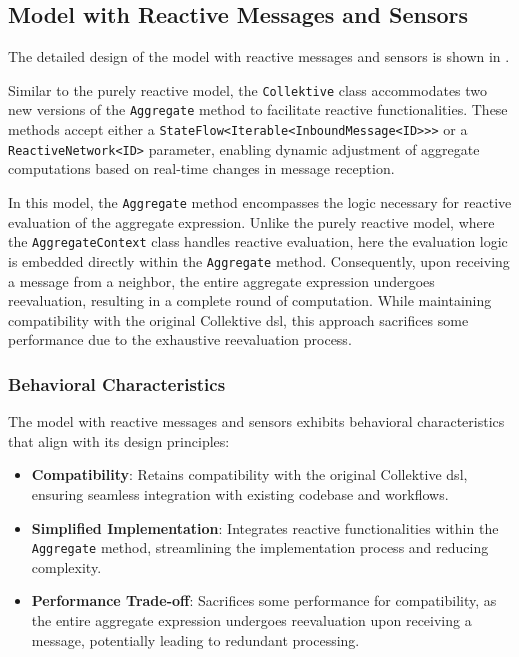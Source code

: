 \subsection{Model with Reactive Messages and Sensors}
The detailed design of the model with reactive messages and sensors is shown in .

Similar to the purely reactive model, the \texttt{Collektive} class accommodates two new versions of the \texttt{Aggregate} method to facilitate reactive functionalities. These methods accept either a \texttt{StateFlow<Iterable<InboundMessage<ID>>>} or a \texttt{ReactiveNetwork<ID>} parameter, enabling dynamic adjustment of aggregate computations based on real-time changes in message reception.

In this model, the \texttt{Aggregate} method encompasses the logic necessary for reactive evaluation of the aggregate expression. Unlike the purely reactive model, where the \texttt{AggregateContext} class handles reactive evaluation, here the evaluation logic is embedded directly within the \texttt{Aggregate} method. Consequently, upon receiving a message from a neighbor, the entire aggregate expression undergoes reevaluation, resulting in a complete round of computation. While maintaining compatibility with the original Collektive \ac{dsl}, this approach sacrifices some performance due to the exhaustive reevaluation process.

\subsubsection{Behavioral Characteristics}

The model with reactive messages and sensors exhibits behavioral characteristics that align with its design principles:

\begin{itemize}
    \item \textbf{Compatibility}: Retains compatibility with the original Collektive \ac{dsl}, ensuring seamless integration with existing codebase and workflows.
    \item \textbf{Simplified Implementation}: Integrates reactive functionalities within the \texttt{Aggregate} method, streamlining the implementation process and reducing complexity.
    \item \textbf{Performance Trade-off}: Sacrifices some performance for compatibility, as the entire aggregate expression undergoes reevaluation upon receiving a message, potentially leading to redundant processing.
\end{itemize}

